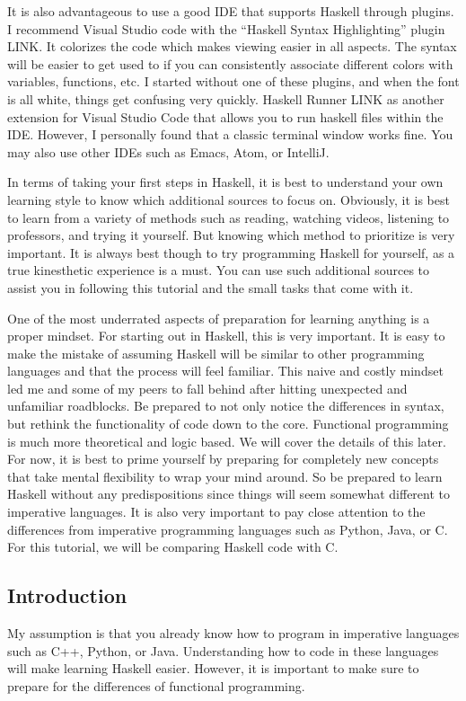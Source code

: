 \documentclass{article}
\begin{document}
\medskip\noindent
It is also advantageous to use a good IDE that supports Haskell through plugins. I recommend Visual Studio code with the “Haskell Syntax Highlighting” plugin LINK. It colorizes the code which makes viewing easier in all aspects. The syntax will be easier to get used to if you can consistently associate different colors with variables, functions, etc. I started without one of these plugins, and when the font is all white, things get confusing very quickly. Haskell Runner LINK as another extension for Visual Studio Code that allows you to run haskell files within the IDE. However, I personally found that a classic terminal window works fine. You may also use other IDEs such as Emacs, Atom, or IntelliJ.

\medskip\noindent
In terms of taking your first steps in Haskell, it is best to understand your own learning style to know which additional sources to focus on. Obviously, it is best to learn from a variety of methods such as reading, watching videos, listening to professors, and trying it yourself. But knowing which method to prioritize is very important. It is always best though to try programming Haskell for yourself, as a true kinesthetic experience is a must. You can use such additional sources to assist you in following this tutorial and the small tasks that come with it.

\medskip\noindent
One of the most underrated aspects of preparation for learning anything is a proper mindset. For starting out in Haskell, this is very important. It is easy to make the mistake of assuming Haskell will be similar to other programming languages and that the process will feel familiar. This naive and costly mindset led me and some of my peers to fall behind after hitting unexpected and unfamiliar roadblocks. Be prepared to not only notice the differences in syntax, but rethink the functionality of code down to the core. Functional programming is much more theoretical and logic based. We will cover the details of this later. For now, it is best to prime yourself by preparing for completely new concepts that take mental flexibility to wrap your mind around. So be prepared to learn Haskell without any predispositions since things will seem somewhat different to imperative languages. It is also very important to pay close attention to the differences from imperative programming languages such as Python, Java, or C. For this tutorial, we will be comparing Haskell code with C.

\subsection{Introduction}
\medskip\noindent
My assumption is that you already know how to program in imperative languages such as C++, Python, or Java. Understanding how to code in these languages will make learning Haskell easier. However, it is important to make sure to prepare for the differences of functional programming.
\end{document}
